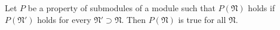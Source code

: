 Let $P$ be a property of submodules of a module such that $P(\mathfrak{N})$ holds if $P(\mathfrak{N}')$ holds for every $\mathfrak{N}' \supset \mathfrak{N}$. Then $P(\mathfrak{N})$ is true for all $\mathfrak{N}$.
